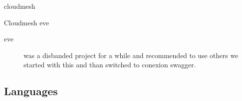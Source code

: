 \documentclass[conference]{IEEEtran}
\begin{document}
\begin{description}

\item[cloudmesh] \cite{cloudmesh-openapi} 

\item[Cloudmesh eve] \cite{www-cloudmesh-spec-eve}

\item[eve] \cite{www-eve} was a disbanded project for a while and recommended to use others we started with this and than switched to conexion swagger.

\end{description}


\subsection{Languages}
\end{document}
